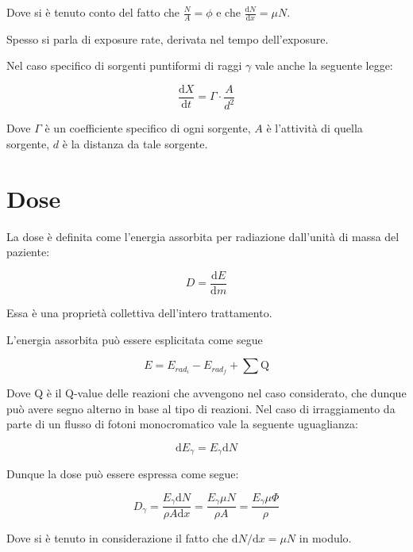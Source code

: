 Dove si è tenuto conto del fatto che $\frac{N}{A}=\phi$ e che $\frac{\mathrm{d}N}{\mathrm{d}x}=\mu N$.

Spesso si parla di exposure rate, derivata nel tempo dell'exposure.

Nel caso specifico di sorgenti puntiformi di raggi $\gamma$ vale anche la seguente legge:

\begin{equation}
\frac{\mathrm{d}X}{\mathrm{d}t}=\Gamma\cdot\frac{A}{d^2}
\end{equation}

Dove $\Gamma$ è un coefficiente specifico di ogni sorgente, $A$ è l'attività di quella sorgente, $d$ è la distanza da tale sorgente.

\section{Dose}

La dose è definita come l'energia assorbita per radiazione dall'unità di massa del paziente:

\begin{equation}
D=\frac{\mathrm{d}E}{\mathrm{d}m}
\end{equation}

Essa è una proprietà collettiva dell'intero trattamento.

L'energia assorbita può essere esplicitata come segue

\begin{equation}
E=E_{rad_{i}}-E_{rad_{f}}+\sum \text{Q}
\end{equation}

Dove Q è il Q-value delle reazioni che avvengono nel caso considerato, che dunque può avere segno alterno in base al tipo di reazioni. Nel caso di irraggiamento da parte di un flusso di fotoni monocromatico vale la seguente uguaglianza:

\begin{equation}
\mathrm{d}E_{\gamma}=E_{\gamma}\mathrm{d}N
\end{equation}

Dunque la dose può essere espressa come segue:

\begin{equation}
D_{\gamma}=\frac{E_{\gamma}\mathrm{d}N}{\rho A\mathrm{d}x}=\frac{E_{\gamma}\mu N}{\rho A}=\frac{E_{\gamma}\mu \Phi}{\rho} 
\end{equation}

Dove si è tenuto in considerazione il fatto che $\mathrm{d}N/\mathrm{d}x=\mu N$ in modulo.\\

